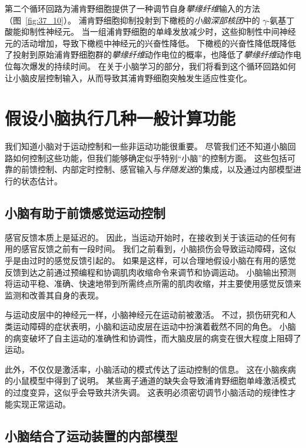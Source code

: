 第二个循环回路为浦肯野细胞提供了一种调节自身\textit{攀缘纤维}输入的方法（图~\ref{fig:37_10}）。
浦肯野细胞抑制投射到下橄榄的\textit{小脑深部核团}中的 $\gamma$-氨基丁酸能抑制性神经元。
当一组浦肯野细胞的单峰发放减少时，这些抑制性中间神经元的活动增加，导致下橄榄中神经元的兴奋性降低。
下橄榄的兴奋性降低既降低了投射到原始浦肯野细胞群的\textit{攀缘纤维}动作电位的概率，也降低了\textit{攀缘纤维}动作电位每次爆发的持续时间。
在关于小脑学习的部分，我们将看到这个循环回路如何让小脑皮层控制输入，从而导致其浦肯野细胞突触发生适应性变化。




\section{假设小脑执行几种一般计算功能}

我们知道小脑对于运动控制和一些非运动功能很重要。
尽管我们还不知道小脑回路如何控制这些功能，但我们能够确定似乎特别“小脑”的控制方面。
这些包括可靠的前馈控制、内部定时控制、感官输入与\textit{伴随发送}的集成，以及通过内部模型进行的状态估计。



\subsection{小脑有助于前馈感觉运动控制}

感官反馈本质上是延迟的。
因此，当运动开始时，在接收到关于该运动的任何有用的感官反馈之前有一段时间。
我们之前看到，小脑损伤会导致运动障碍，这似乎是由过时的感觉反馈引起的。
如果是这样，可以合理地假设小脑在有用的感觉反馈到达之前通过预编程和协调肌肉收缩命令来调节和协调运动。
小脑输出预测将运动平稳、准确、快速地带到所需终点所需的肌肉收缩，并主要使用感觉反馈来监测和改善其自身的表现。


与运动皮层中的神经元一样，小脑神经元在运动前被激活。
不过，损伤研究和人类运动障碍的症状表明，小脑和运动皮层在运动中扮演着截然不同的角色。
小脑的病变破坏了自主运动的准确性和协调性，而大脑皮层的病变在很大程度上阻碍了运动。


此外，不仅仅是激活率，小脑活动的模式传达了运动控制的信息。
这在小脑疾病的小鼠模型中得到了说明。
某些离子通道的缺失会导致浦肯野细胞单峰激活模式的过度变异，这似乎会导致共济失调。
这表明必须密切调节小脑活动的规律性才能实现正常运动。



\subsection{小脑结合了运动装置的内部模型}

